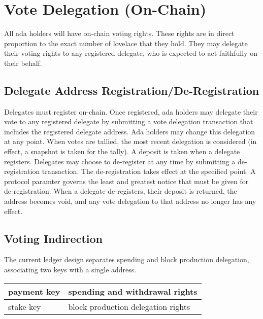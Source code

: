 \newpage
\section{Vote Delegation (On-Chain)}
\label{sect:delegation}

All ada holders will have on-chain voting rights.  These rights are in direct proportion to the exact number of lovelace that they hold.
They may delegate their voting rights to any registered delegate, who is expected to act faithfully on their behalf.

\subsection{Delegate Address Registration/De-Registration}

Delegates must register on-chain.  Once registered, ada holders may delegate their
vote to any registered delegate by submitting a vote delegation transaction that includes the registered delegate address.
Ada holders may change this delegation at any point.  When votes are tallied, the most recent delegation is considered (in effect, a snapshot is taken for the tally).
A deposit is taken when a delegate registers.  Delegates may choose to de-register at any time by submitting a de-registration transaction.  The de-registration takes effect
at the specified point.  A protocol paramter governs the least and greatest notice that must be given for de-registration.  When a delegate de-registers, their deposit is returned,
the address becomes void, and any vote delegation to that address no longer has any effect.

\subsection{Voting Indirection}

The current ledger design separates spending and block production delegation, associating two keys with a single address.

\begin{center}
  \begin{tabular}{||l|l||}
\hline\hline
  payment key & spending and withdrawal rights \\\hline
  stake key & block production delegation rights \\\hline
  \hline\hline
  \end{tabular}
\end{center}

